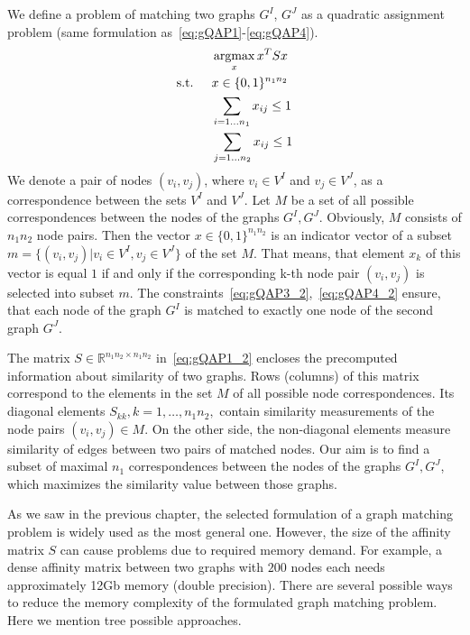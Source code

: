 We define a problem of matching two graphs $G^I$, $G^J$ as a quadratic assignment problem (same formulation as~\eqref{eq:gQAP1}-\eqref{eq:gQAP4}). 
\begin{alignat}{2}
    &     && \mathop{\rm argmax}_x{x^TSx}                           \label{eq:gQAP1_2}\\
    & \text{s.t. } &&  x\in \{0,1\}^{n_1n_2}            \label{eq:gQAP2_2}\\
    &             &&  \sum_{i=1\dots n_1} x_{ij}\le 1   \label{eq:gQAP3_2}\\
    &             &&  \sum_{j=1\dots n_2} x_{ij}\le 1   \label{eq:gQAP4_2}
\end{alignat}
We denote a pair of nodes $(v_i,v_j)$, where $v_i\in V^I$ and $v_j\in V^J$, as a correspondence between the sets $V^I$ and $V^J$. Let $M$ be a set of all possible correspondences between the nodes of the graphs $G^I,G^J$. Obviously, $M$ consists of $n_1n_2$ node pairs.  Then the vector $x\in \{0,1\}^{n_1n_2}$ is an indicator vector of a subset $m=\{(v_i,v_j)|v_i\in V^I,v_j\in V^J\}$ of the set $M$. That means, that element $x_k$ of this vector is equal $1$ if and only if the corresponding k-th node pair $(v_i,v_j)$ is selected into subset $m$. The constraints~\eqref{eq:gQAP3_2},~\eqref{eq:gQAP4_2} ensure, that each node of the graph $G^I$ is matched to exactly one node of the second graph $G^J$.

The matrix $S\in\mathbb{R}^{n_1n_2\times n_1n_2}$ in~\eqref{eq:gQAP1_2} encloses the precomputed information about similarity of two graphs. Rows (columns) of this matrix correspond to the elements in the set $M$ of all possible node correspondences. Its diagonal elements $S_{kk},k=1,\dots,n_1n_2,$ contain similarity measurements of the node pairs $(v_i,v_j)\in M$. On the other side, the non-diagonal elements measure similarity of edges between two pairs of matched nodes. Our aim is to find a subset of maximal $n_1$ correspondences between the nodes of the graphs $G^I,G^J$, which maximizes the similarity value between those graphs.

As we saw in the previous chapter, the selected formulation of a graph matching problem is widely used as the most general one. However, the size of the affinity matrix $S$ can cause problems due to required memory demand. For example, a dense affinity matrix between two graphs with $200$ nodes each needs approximately 12Gb memory (double precision). There are several possible ways to reduce the memory complexity of the formulated graph matching problem. Here we mention tree possible approaches.

